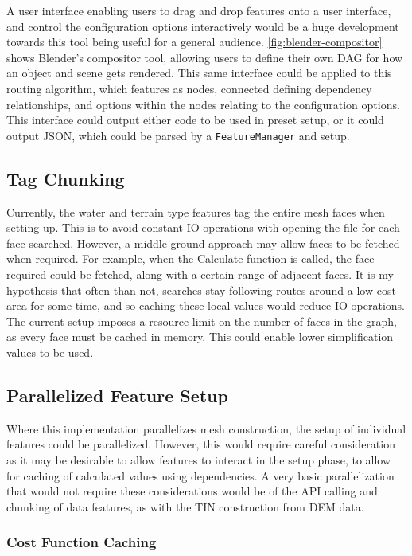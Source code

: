 \documentclass[12pt]{article}
\begin{document}
A user interface enabling users to drag and drop features onto a user interface, and control the configuration options interactively would be a huge development towards this tool being useful for a general audience. \autoref{fig:blender-compositor} shows Blender's compositor tool, allowing users to define their own DAG for how an object and scene gets rendered. This same interface could be applied to this routing algorithm, which features as nodes, connected defining dependency relationships, and options within the nodes relating to the configuration options. This interface could output either code to be used in preset setup, or it could output JSON, which could be parsed by a \texttt{FeatureManager} and setup.


\subsection{Tag Chunking}

Currently, the water and terrain type features tag the entire mesh faces when setting up. This is to avoid constant IO operations with opening the file for each face searched. However, a middle ground approach may allow faces to be fetched when required. For example, when the Calculate function is called, the face required could be fetched, along with a certain range of adjacent faces. It is my hypothesis that often than not, searches stay following routes around a low-cost area for some time, and so caching these local values would reduce IO operations. The current setup imposes a resource limit on the number of faces in the graph, as every face must be cached in memory. This could enable lower simplification values to be used.

\subsection{Parallelized Feature Setup}

Where this implementation parallelizes mesh construction, the setup of individual features could be parallelized. However, this would require careful consideration as it may be desirable to allow features to interact in the setup phase, to allow for caching of calculated values using dependencies. A very basic parallelization that would not require these considerations would be of the API calling and chunking of data features, as with the TIN construction from DEM data.

\subsubsection{Cost Function Caching}
\end{document}
